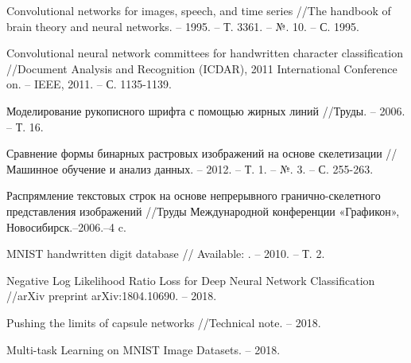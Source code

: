 \documentclass{llncs}
\begin{document}
\begin{thebibliography}{1}

	 Convolutional networks for images, speech, and time series //The handbook of brain theory and neural networks. – 1995. – Т. 3361. – №. 10. – С. 1995.
	 
 	Convolutional neural network committees for handwritten character classification //Document Analysis and Recognition (ICDAR), 2011 International Conference on. – IEEE, 2011. – С. 1135-1139.
 
	 Моделирование рукописного шрифта с помощью жирных линий //Труды. – 2006. – Т. 16.

	 Сравнение формы бинарных растровых изображений на основе скелетизации //Машинное обучение и анализ данных. – 2012. – Т. 1. – №. 3. – С. 255-263.
	 
	 Распрямление текстовых строк на основе непрерывного гранично-скелетного представления изображений //Труды Международной конференции «Графикон», Новосибирск.–2006.–4 c.

	MNIST handwritten digit database //
	Available: 
	 . – 2010. – Т. 2.

	 Negative Log Likelihood Ratio Loss for Deep Neural Network Classification //arXiv preprint arXiv:1804.10690. – 2018.
	 
	Pushing the limits of capsule networks //Technical note. – 2018.

	 Multi-task Learning on MNIST Image Datasets. – 2018.

\end{thebibliography}
\end{document}
